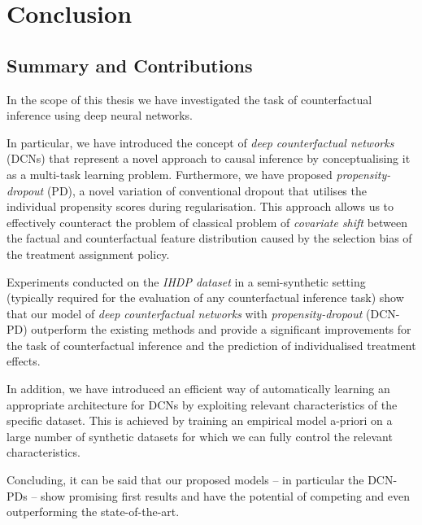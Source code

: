 %

\chapter{\label{ch:6-conclusion}Conclusion} 

\section{Summary and Contributions}
In the scope of this thesis we have investigated the task of counterfactual inference using deep neural networks. 

In particular, we have introduced the concept of \emph{deep counterfactual networks} (DCNs) that represent a novel approach to causal inference by conceptualising it as a multi-task learning problem. Furthermore, we have proposed \emph{propensity-dropout} (PD), a novel variation of conventional dropout that utilises the individual propensity scores during regularisation. This approach allows us to effectively counteract the problem of classical problem of \emph{covariate shift} between the factual and counterfactual feature distribution caused by the selection bias of the treatment assignment policy. 

Experiments conducted on the \emph{IHDP dataset} in a semi-synthetic setting (typically required for the evaluation of any counterfactual inference task) show that our model of \emph{deep counterfactual networks} with \emph{propensity-dropout} (DCN-PD) outperform the existing methods and provide a significant improvements for the task of counterfactual inference and the prediction of individualised treatment effects. 


In addition, we have introduced an efficient way of automatically learning an appropriate architecture for DCNs by exploiting relevant characteristics of the specific dataset. This is achieved by training an empirical model a-priori on a large number of synthetic datasets for which we can fully control the relevant characteristics.

Concluding, it can be said that our proposed models -- in particular the DCN-PDs -- show promising first results and have the potential of competing and even outperforming the state-of-the-art.

